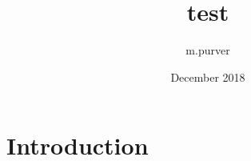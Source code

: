 \documentclass{article}
\title{test}
\author{m.purver }
\date{December 2018}
\begin{document}
\maketitle

\section{Introduction}
\end{document}
